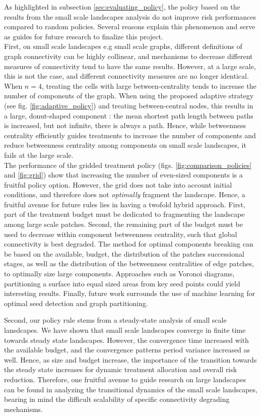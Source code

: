 As highlighted in subsection \ref{sec:evaluating_policy}, the policy based on the results from the small scale landscapes analysis do not improve risk performances compared to random policies. Several reasons explain this phenomenon and serve as guides for future research to finalize this project. 
\\
First, on small scale landscapes e.g small scale graphs, different definitions of graph connectivity can be highly collinear, and mechanisms to decrease different measures of connectivity tend to have the same results. However, at a large scale, this is not the case, and different connectivity measures are no longer identical. When $n=4$, treating the cells with large between-centrality tends to increase the number of components of the graph. When using the proposed adaptive strategy (see fig. \ref{fig:adaptive_policy}) and treating between-central nodes, this results in a large, donut-shaped component : the mean shortest path length between paths is increased, but not infinite, there is always a path. Hence, while betweenness centrality efficiently guides treatments to increase the number of components and reduce betweenness centrality among components on small scale landscapes, it fails at the large scale. 
\\
The performance of the gridded treatment policy (figs. \ref{fig:comparison_policies} and \ref{fig:grid}) show that increasing the number of even-sized components is a fruitful policy option. However, the grid does not take into account initial conditions, and therefore does not \textit{optimally} fragment the landscape. Hence, a fruitful avenue for future rules lies in having a twofold hybrid approach. First, part of the treatment budget must be dedicated to fragmenting the landscape among large scale patches. Second, the remaining part of the budget must be used to decrease within component betweenness centrality, such that global connectivity is best degraded. The method for optimal components breaking can be based on the available, budget, the distribution of the patches successional stages, as well as the distribution of the betweenness centralities of edge patches, to optimally size large components. Approaches such as Voronoi diagrams, partitioning a surface into equal sized areas from key seed points could yield interesting results. Finally, future work surrounds the use of machine learning for optimal seed detection and graph partitioning.  

Second, our policy rule stems from a steady-state analysis of small scale lansdcapes. We have shown that small scale landscapes converge in finite time towards steady state landscapes. However, the convergence time increased with the available budget, and the convergence patterns period variance increased as well. Hence, as size and budget increase, the importance of the transition towards the steady state increases for dynamic treatment allocation and overall risk reduction. Therefore, one fruitful avenue to guide research on large landscapes can be found in analyzing the transitional dynamics of the small scale landscapes, bearing in mind the difficult scalability of specific connectivity degrading mechanisms. 

